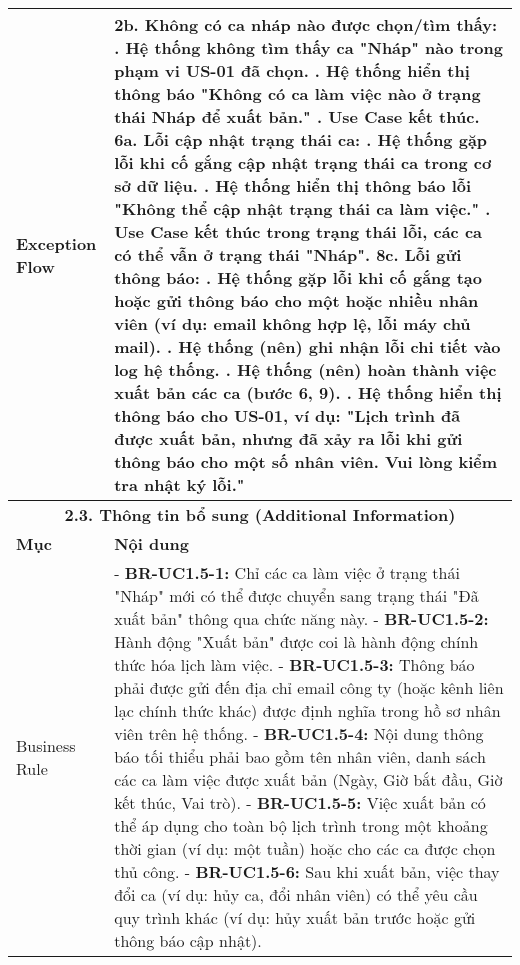 \begin{longtable}{|m{4cm}|p{11cm}|}
\hline
Exception Flow & \textbf{2b. Không có ca nháp nào được chọn/tìm thấy:} \newline    1. Hệ thống không tìm thấy ca "Nháp" nào trong phạm vi US-01 đã chọn. \newline    2. Hệ thống hiển thị thông báo "Không có ca làm việc nào ở trạng thái Nháp để xuất bản." \newline    3. Use Case kết thúc. \newline \textbf{6a. Lỗi cập nhật trạng thái ca:} \newline    1. Hệ thống gặp lỗi khi cố gắng cập nhật trạng thái ca trong cơ sở dữ liệu. \newline    2. Hệ thống hiển thị thông báo lỗi "Không thể cập nhật trạng thái ca làm việc." \newline    3. Use Case kết thúc trong trạng thái lỗi, các ca có thể vẫn ở trạng thái "Nháp". \newline \textbf{8c. Lỗi gửi thông báo:} \newline    1. Hệ thống gặp lỗi khi cố gắng tạo hoặc gửi thông báo cho một hoặc nhiều nhân viên (ví dụ: email không hợp lệ, lỗi máy chủ mail). \newline    2. Hệ thống (nên) ghi nhận lỗi chi tiết vào log hệ thống. \newline    3. Hệ thống (nên) hoàn thành việc xuất bản các ca (bước 6, 9). \newline    4. Hệ thống hiển thị thông báo cho US-01, ví dụ: "Lịch trình đã được xuất bản, nhưng đã xảy ra lỗi khi gửi thông báo cho một số nhân viên. Vui lòng kiểm tra nhật ký lỗi." \\
\hline
\multicolumn{2}{|c|}{\textbf{2.3. Thông tin bổ sung (Additional Information)}} \\
\hline
\textbf{Mục} & \textbf{Nội dung} \\
\hline
Business Rule & - \textbf{BR-UC1.5-1:} Chỉ các ca làm việc ở trạng thái "Nháp" mới có thể được chuyển sang trạng thái "Đã xuất bản" thông qua chức năng này. \newline - \textbf{BR-UC1.5-2:} Hành động "Xuất bản" được coi là hành động chính thức hóa lịch làm việc. \newline - \textbf{BR-UC1.5-3:} Thông báo phải được gửi đến địa chỉ email công ty (hoặc kênh liên lạc chính thức khác) được định nghĩa trong hồ sơ nhân viên trên hệ thống. \newline - \textbf{BR-UC1.5-4:} Nội dung thông báo tối thiểu phải bao gồm tên nhân viên, danh sách các ca làm việc được xuất bản (Ngày, Giờ bắt đầu, Giờ kết thúc, Vai trò). \newline - \textbf{BR-UC1.5-5:} Việc xuất bản có thể áp dụng cho toàn bộ lịch trình trong một khoảng thời gian (ví dụ: một tuần) hoặc cho các ca được chọn thủ công. \newline - \textbf{BR-UC1.5-6:} Sau khi xuất bản, việc thay đổi ca (ví dụ: hủy ca, đổi nhân viên) có thể yêu cầu quy trình khác (ví dụ: hủy xuất bản trước hoặc gửi thông báo cập nhật). \\

\end{longtable}
